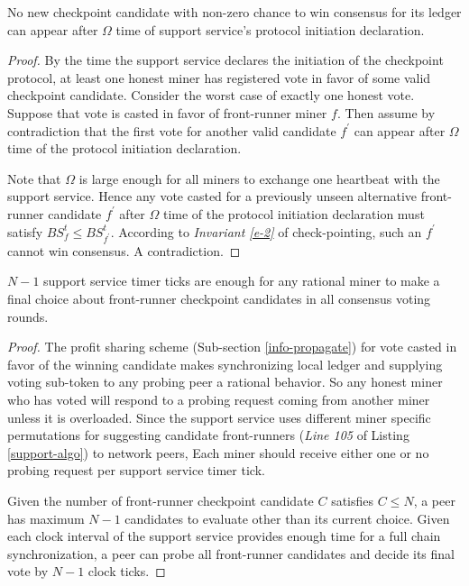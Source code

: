 \begin{lemma}
\label{l-cand-list}
No new checkpoint candidate with non-zero chance to win consensus for its ledger can appear after $\Omega$ time of support service's protocol initiation declaration.     
\end{lemma}
\begin{proof}
By the time the support service declares the initiation of the checkpoint protocol, at least one honest miner has registered vote in favor of some valid checkpoint candidate. Consider the worst case of exactly one honest vote. Suppose that vote is casted in favor of front-runner miner $f$. Then assume by contradiction that the first vote for another valid candidate $f^\prime$ can appear after $\Omega$ time of the protocol initiation declaration. 

Note that $\Omega$ is large enough for all miners to exchange one heartbeat with the support service. Hence any vote casted for a previously unseen alternative front-runner candidate $f^\prime$ after $\Omega$ time of the protocol initiation declaration must satisfy $BS_f^t \leq BS_{f^\prime}^t$. According to \textit{Invariant \ref{e-2}} of check-pointing, such an $f^\prime$ cannot win consensus. A contradiction.  
\end{proof}

\begin{lemma}
\label{l-round-time}
$N - 1$ support service timer ticks are enough for any rational miner to make a final choice about front-runner checkpoint candidates in all consensus voting rounds.   
\end{lemma}
\begin{proof}
The profit sharing scheme (Sub-section \ref{info-propagate}) for vote casted in favor of the winning candidate makes synchronizing local ledger and supplying voting sub-token to any probing peer a rational behavior. So any honest miner who has voted will respond to a probing request coming from another miner unless it is overloaded. Since the support service uses different miner specific permutations for suggesting candidate front-runners (\textit{Line 105} of Listing \ref{support-algo}) to network peers, Each miner should receive either one or no probing request per support service timer tick.

Given the number of front-runner checkpoint candidate $C$ satisfies $C \leq N$, a peer has maximum $N - 1$ candidates to evaluate other than its current choice. Given each clock interval of the support service provides enough time for a full chain synchronization, a peer can probe all front-runner candidates and decide its final vote by $N - 1$ clock ticks.         
\end{proof}

